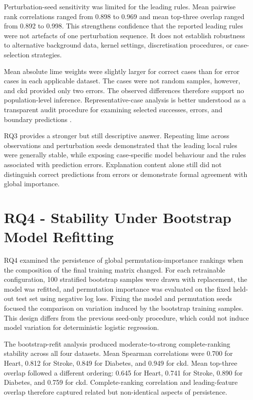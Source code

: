 Perturbation-seed sensitivity was limited for the leading rules. Mean pairwise rank correlations ranged from 0.898 to 0.969 and mean top-three overlap ranged from 0.892 to 0.998. This strengthens confidence that the reported leading rules were not artefacts of one perturbation sequence. It does not establish robustness to alternative background data, kernel settings, discretisation procedures, or case-selection strategies.

Mean absolute \gls{lime} weights were slightly larger for correct cases than for error cases in each applicable dataset. The cases were not random samples, however, and \gls{ckd} provided only two errors. The observed differences therefore support no population-level inference. Representative-case analysis is better understood as a transparent audit procedure for examining selected successes, errors, and boundary predictions \citep{ribeiro_why_2016, mohseni_multidisciplinary_2021}.

RQ3 provides a stronger but still descriptive answer. Repeating \gls{lime} across observations and perturbation seeds demonstrated that the leading local rules were generally stable, while exposing case-specific model behaviour and the rules associated with prediction errors. Explanation content alone still did not distinguish correct predictions from errors or demonstrate formal agreement with global importance.

\section{RQ4 - Stability Under Bootstrap Model Refitting}

RQ4 examined the persistence of global permutation-importance rankings when the composition of the final training matrix changed. For each retrainable configuration, 100 stratified bootstrap samples were drawn with replacement, the model was refitted, and permutation importance was evaluated on the fixed held-out test set using negative log loss. Fixing the model and permutation seeds focused the comparison on variation induced by the bootstrap training samples. This design differs from the previous seed-only procedure, which could not induce model variation for deterministic logistic regression.

The bootstrap-refit analysis produced moderate-to-strong complete-ranking stability across all four datasets. Mean Spearman correlations were 0.700 for Heart, 0.812 for Stroke, 0.849 for Diabetes, and 0.949 for \gls{ckd}. Mean top-three overlap followed a different ordering: 0.645 for Heart, 0.741 for Stroke, 0.890 for Diabetes, and 0.759 for \gls{ckd}. Complete-ranking correlation and leading-feature overlap therefore captured related but non-identical aspects of persistence.

